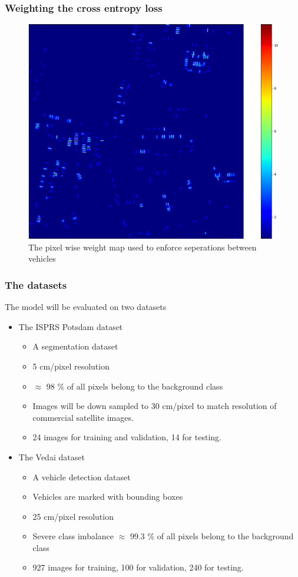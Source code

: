 \documentclass[aspectratio=1610]{beamer}
\begin{document}
\begin{frame}
  \frametitle{\hfill Weighting the cross entropy loss}
\begin{figure}[h!]
\centering
      \includegraphics[scale=0.18]{weight_map_3}
\caption{The pixel wise weight map used to enforce seperations between vehicles} \label{fig:SBD}
\end{figure}
\end{frame}

\begin{frame}
  \frametitle{\hfill The datasets}
	  \begin{block}{The model will be evaluated on two datasets}
    \begin{itemize}
        \item The ISPRS Potsdam dataset
        \begin{itemize}
    \item A segmentation dataset
    \item 5 cm/pixel resolution
    \item $\approx$ 98 \% of all pixels belong to  the background class
    \item Images will be down sampled to 30 cm/pixel to match resolution of commercial satellite images.
    \item 24 images for training and validation, 14 for testing.
    \end{itemize}
    \item The Vedai dataset
    \begin{itemize}
    \item A vehicle detection dataset
    \item Vehicles are marked with bounding boxes
    \item 25 cm/pixel resolution
    \item Severe class imbalance $\approx$ 99.3 \% of all pixels belong to the background class
    \item 927 images for training, 100 for validation, 240 for testing.
    \end{itemize}
    \end{itemize}
  \end{block}
\end{frame}
\end{document}
